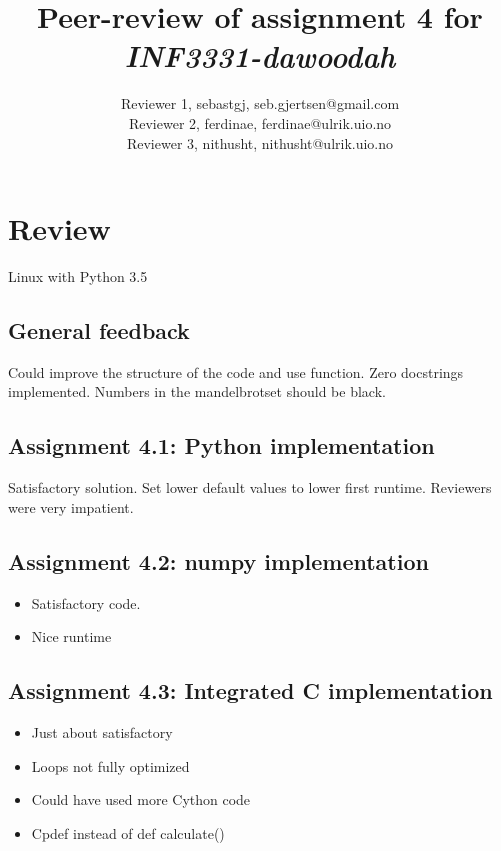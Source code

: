 \documentclass[a4paper]{article}
\title{Peer-review of assignment 4 for \textit{INF3331-dawoodah }}
\author{Reviewer 1, sebastgj, {seb.gjertsen@gmail.com} \\
 		Reviewer 2, ferdinae, {ferdinae@ulrik.uio.no} \\
		Reviewer 3, nithusht, {nithusht@ulrik.uio.no}}
\begin{document}
\maketitle

\section{Review} \label{sec:review}

Linux with Python 3.5 

\subsection*{General feedback}
Could improve the structure of the code and use function.
Zero docstrings implemented.
Numbers in the mandelbrotset should be black. 

\subsection*{Assignment 4.1: Python implementation}
Satisfactory solution. Set lower default values to lower first runtime. Reviewers were very impatient. 

\subsection*{Assignment 4.2:  numpy implementation} \label{sec:assignment5.2}

\begin{itemize}
  \item Satisfactory code. 
  \item Nice runtime 
\end{itemize}


\subsection*{Assignment 4.3: Integrated C implementation}
\begin{itemize}
  \item Just about satisfactory
  \item Loops not fully optimized
  \item Could have used more Cython code 
  \item Cpdef instead of def calculate()
\end{itemize}
\end{document}
